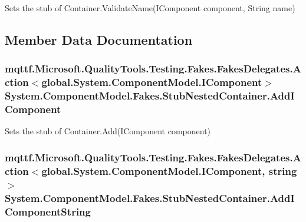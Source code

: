 Sets the stub of Container.\-Validate\-Name(\-I\-Component component, String name)



\subsection{Member Data Documentation}
\hypertarget{class_system_1_1_component_model_1_1_fakes_1_1_stub_nested_container_a3ff69c5f6a2aa7ee878f680b53fcbd4e}{
\subsubsection[{Add\-I\-Component}]{\setlength{\rightskip}{0pt plus 5cm}mqttf.\-Microsoft.\-Quality\-Tools.\-Testing.\-Fakes.\-Fakes\-Delegates.\-Action$<$global.\-System.\-Component\-Model.\-I\-Component$>$ System.\-Component\-Model.\-Fakes.\-Stub\-Nested\-Container.\-Add\-I\-Component}}\label{class_system_1_1_component_model_1_1_fakes_1_1_stub_nested_container_a3ff69c5f6a2aa7ee878f680b53fcbd4e}


Sets the stub of Container.\-Add(\-I\-Component component)

\hypertarget{class_system_1_1_component_model_1_1_fakes_1_1_stub_nested_container_af0f463a7686d4eeadaa945219956b0a9}{
\subsubsection[{Add\-I\-Component\-String}]{\setlength{\rightskip}{0pt plus 5cm}mqttf.\-Microsoft.\-Quality\-Tools.\-Testing.\-Fakes.\-Fakes\-Delegates.\-Action$<$global.\-System.\-Component\-Model.\-I\-Component, string$>$ System.\-Component\-Model.\-Fakes.\-Stub\-Nested\-Container.\-Add\-I\-Component\-String}}\label{class_system_1_1_component_model_1_1_fakes_1_1_stub_nested_container_af0f463a7686d4eeadaa945219956b0a9}


